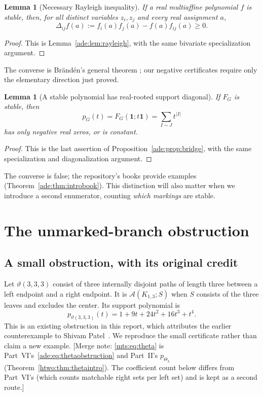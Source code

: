 \documentclass[11pt]{article}
\numberwithin{equation}{section}
\newtheorem{lemma}[theorem]{Lemma}
\theoremstyle{definition}
\newcommand{\one}{\mathbf 1}
\newcommand{\calA}{\mathcal A}
\newcommand{\del}{\Delta}
\begin{document}
\begin{lemma}[Necessary Rayleigh inequality]\label{mts:lem:rayleigh}
If a real multiaffine polynomial $f$ is stable, then, for all distinct
variables $z_i,z_j$ and every real assignment $a$,
\begin{equation}
 \del_{ij}f(a):=f_i(a)f_j(a)-f(a)f_{ij}(a)\ge0.
 \label{mts:eq:rayleigh}
\end{equation}
\end{lemma}
\begin{proof}
This is Lemma~\ref{ade:lem:rayleigh}, with the same bivariate
specialization argument.
\end{proof}

The converse is Br\"and\'en's general theorem \cite{Branden}; our negative
certificates require only the elementary direction just proved.

\begin{lemma}[A stable polynomial has real-rooted support diagonal]\label{mts:lem:diagonal}
If $F_G$ is stable, then
\begin{equation}
 p_G(t)=F_G(\one;t\one)=\sum_{I\sim J}t^{|I|}
 \label{mts:eq:p}
\end{equation}
has only negative real zeros, or is constant.
\end{lemma}
\begin{proof}
This is the last assertion of Proposition~\ref{ade:prop:bridge}, with the
same specialization and diagonalization argument.
\end{proof}

The converse is false; the repository's books provide examples
(Theorem~\ref{ade:thm:introbook}). This distinction will also matter when we introduce
a second enumerator, counting \emph{which markings} are stable.

\section{The unmarked-branch obstruction}\label{mts:sec:branch}

\subsection{A small obstruction, with its original credit}

Let $\vartheta(3,3,3)$ consist of three internally disjoint paths of length three
between a left endpoint and a right endpoint. It is $\calA(K_{1,3};S)$ when
$S$ consists of the three leaves and excludes the center. Its support
polynomial is
\begin{equation}
 p_{\vartheta(3,3,3)}(t)=1+9t+24t^2+16t^3+t^4.
 \label{mts:eq:theta}
\end{equation}
This is an existing obstruction in this report, which attributes the earlier
counterexample to Shivam Patel~\cite{Patel}. We reproduce the small certificate rather
than claim a new example.
[Merge note: \eqref{mts:eq:theta} is Part~VI's~\eqref{ade:eq:thetaobstruction}
and Part~II's $p_{\Theta_3}$ (Theorem~\ref{htwo:thm:thetaintro}). The
coefficient count below differs from Part~VI's (which counts matchable
right sets per left set) and is kept as a second route.]
\end{document}
